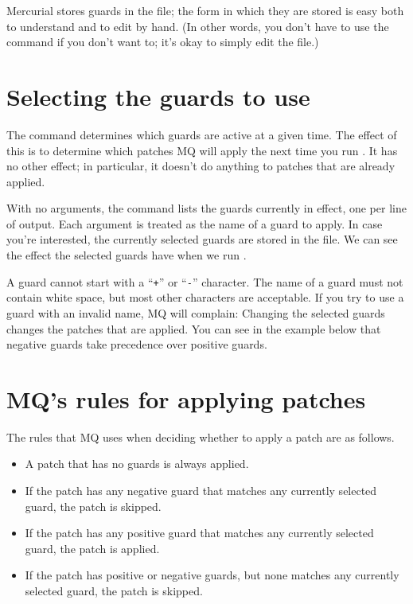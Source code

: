 Mercurial stores guards in the  file; the form in
which they are stored is easy both to understand and to edit by hand.
(In other words, you don't have to use the  command if
you don't want to; it's okay to simply edit the 
file.)

\section{Selecting the guards to use}

The  command determines which guards are active at a
given time.  The effect of this is to determine which patches MQ will
apply the next time you run .  It has no other effect; in
particular, it doesn't do anything to patches that are already
applied.

With no arguments, the  command lists the guards
currently in effect, one per line of output.  Each argument is treated
as the name of a guard to apply.
In case you're interested, the currently selected guards are stored in
the  file.
We can see the effect the selected guards have when we run
.

A guard cannot start with a ``\texttt{+}'' or ``\texttt{-}''
character.  The name of a guard must not contain white space, but most
other characters are acceptable.  If you try to use a guard with an
invalid name, MQ will complain:
Changing the selected guards changes the patches that are applied.
You can see in the example below that negative guards take precedence
over positive guards.

\section{MQ's rules for applying patches}

The rules that MQ uses when deciding whether to apply a patch
are as follows.
\begin{itemize}
\item A patch that has no guards is always applied.
\item If the patch has any negative guard that matches any currently
  selected guard, the patch is skipped.
\item If the patch has any positive guard that matches any currently
  selected guard, the patch is applied.
\item If the patch has positive or negative guards, but none matches
  any currently selected guard, the patch is skipped.
\end{itemize}

